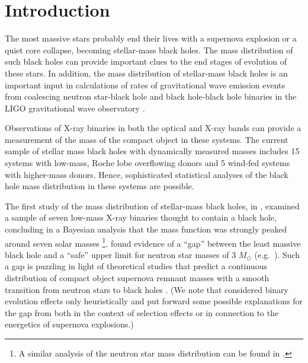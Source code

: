 \documentclass[preprint]{aastex}
\newcommand{\Msun}{M_\odot}
\begin{document}
\section{Introduction}
\label{sec:intro}

The most massive stars probably end their lives with a supernova
explosion or a quiet core collapse, becoming stellar-mass black holes.
The mass distribution of such black holes can provide important clues
to the end stages of evolution of these stars.  In addition, the mass
distribution of stellar-mass black holes is an important input in
calculations of rates of gravitational wave emission events from
coalescing neutron star-black hole and black hole-black hole binaries
in the LIGO gravitational wave observatory \citep{Abadie2010}.

Observations of X-ray binaries in both the optical and X-ray bands can
provide a measurement of the mass of the compact object in these
systems.  The current sample of stellar mass black holes with
dynamically measured masses includes 15 systems with low-mass, Roche
lobe overflowing donors and 5 wind-fed systems with higher-mass
donors.  Hence, sophisticated statistical analyses of the black hole
mass distribution in these systems are possible.

The first study of the mass distribution of stellar-mass black holes,
in \citet{Bailyn1998}, examined a sample of seven low-mass X-ray
binaries thought to contain a black hole, concluding in a Bayesian
analysis that the mass function was strongly peaked around seven solar
masses%
\footnote{A similar analysis of the neutron star mass distribution can
  be found in \citet{Finn1994}.}. %
\citet{Bailyn1998} found evidence of a ``gap'' between the least
massive black hole and a ``safe'' upper limit for neutron star masses
of 3 $\Msun$ (e.g.\ \citet{Kalogera1996}).  Such a gap is puzzling in
light of theoretical studies that predict a continuous distribution of
compact object supernova remnant masses with a smooth transition from
neutron stars to black holes \citep{Fryer2001}.  (We note that
\citet{Fryer2001} considered binary evolution effects only
heuristically and put forward some possible explanations for the gap
from \citet{Bailyn1998} both in the context of selection effects or in
connection to the energetics of supernova explosions.)
\end{document}

